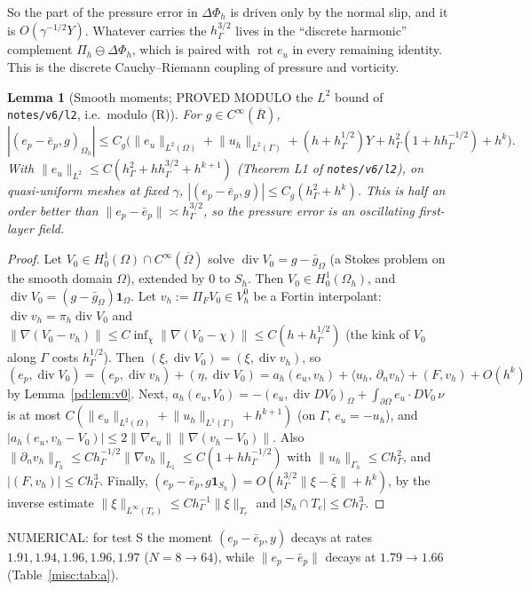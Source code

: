 \documentclass[11pt,reqno]{amsart}
\theoremstyle{plain}
\newtheorem{lemma}[theorem]{Lemma}
\theoremstyle{definition}
\newcommand{\hG}{h_\Gamma}
\newcommand{\Gh}{\Gamma_h}
\newcommand{\Oh}{\Omega_h}
\newcommand{\VO}{V_h^0}
\newcommand{\Pih}{\Pi_h}
\newcommand{\dn}{\partial_n}
\newcommand{\ip}[2]{\langle #1,\, #2\rangle}
\newcommand{\norm}[1]{\lVert #1\rVert}
\renewcommand{\div}{\operatorname{div}}
\DeclareMathOperator{\rot}{rot}
\newcommand{\Lay}{L_1}
\newcommand{\Phih}{\Phi_h}        %
\begin{document}
So the part of the pressure error in $\Delta\Phih$ is driven only by the normal slip, and it is $O(\gamma^{-1/2}Y)$. Whatever carries the $\hG^{3/2}$ lives in the ``discrete harmonic'' complement $\Pih\ominus\Delta\Phih$, which is paired with $\rot e_u$ in every remaining identity. This is the discrete Cauchy--Riemann coupling of pressure and vorticity.

\begin{lemma}[Smooth moments; PROVED MODULO the $L^2$ bound of \texttt{notes/v6/l2}, i.e.\ modulo (R)]\label{misc:lem:A3}
For $g\in C^\infty(\overline R)$,
\[
|(e_p-\bar e_p,g)_{\Oh}|\le C_g\bigl(\norm{e_u}_{L^2(\Omega)}+\norm{u_h}_{L^2(\Gamma)}+(h+\hG^{1/2})Y+\hG^2(1+h\hG^{-1/2})+h^k\bigr).
\]
With $\norm{e_u}_{L^2}\le C(\hG^2+h\hG^{3/2}+h^{k+1})$ (Theorem L1 of \texttt{notes/v6/l2}), on quasi-uniform meshes at fixed $\gamma$, $|(e_p-\bar e_p,g)|\le C_g(\hG^2+h^k)$. This is half an order better than $\norm{e_p-\bar e_p}\asymp\hG^{3/2}$, so the pressure error is an oscillating first-layer field.
\end{lemma}

\begin{proof}
Let $V_0\in H^1_0(\Omega)\cap C^\infty(\overline\Omega)$ solve $\div V_0=g-\bar g_\Omega$ (a Stokes problem on the smooth domain $\Omega$), extended by $0$ to $S_h$. Then $V_0\in H^1_0(\Oh)$, and $\div V_0=(g-\bar g_\Omega)\mathbf 1_\Omega$. Let $v_h:=\Pi_FV_0\in\VO$ be a Fortin interpolant: $\div v_h=\pi_h\div V_0$ and $\norm{\nabla(V_0-v_h)}\le C\inf_{\chi}\norm{\nabla(V_0-\chi)}\le C(h+\hG^{1/2})$ (the kink of $V_0$ along $\Gamma$ costs $\hG^{1/2}$). Then $(\xi,\div V_0)=(\xi,\div v_h)$, so
\[
(e_p,\div V_0)=(e_p,\div v_h)+(\eta,\div V_0)=a_h(e_u,v_h)+\ip{u_h}{\dn v_h}+(F,v_h)+O(h^k)
\]
by Lemma~\ref{pd:lem:v0}. Next, $a_h(e_u,V_0)=-(e_u,\div DV_0)_\Omega+\int_{\partial\Omega}e_u\cdot DV_0\,\nu$ is at most $C(\norm{e_u}_{L^2(\Omega)}+\norm{u_h}_{L^1(\Gamma)}+h^{k+1})$ (on $\Gamma$, $e_u=-u_h$), and $|a_h(e_u,v_h-V_0)|\le2\norm{\nabla e_u}\norm{\nabla(v_h-V_0)}$. Also $\norm{\dn v_h}_{\Gh}\le C\hG^{-1/2}\norm{\nabla v_h}_{\Lay}\le C(1+h\hG^{-1/2})$ with $\norm{u_h}_{\Gh}\le C\hG^2$, and $|(F,v_h)|\le C\hG^3$. Finally, $(e_p-\bar e_p,g\mathbf 1_{S_h})=O(\hG^{3/2}\norm{\xi-\bar\xi}+h^k)$, by the inverse estimate $\norm\xi_{L^\infty(T_e)}\le C\hG^{-1}\norm\xi_{T_e}$ and $|S_h\cap T_e|\le C\hG^3$.
\end{proof}

NUMERICAL: for test S the moment $(e_p-\bar e_p,y)$ decays at rates $1.91,1.94,1.96,1.96,1.97$ ($N=8\to64$), while $\norm{e_p-\bar e_p}$ decays at $1.79\to1.66$ (Table~\ref{misc:tab:a}).
\end{document}
